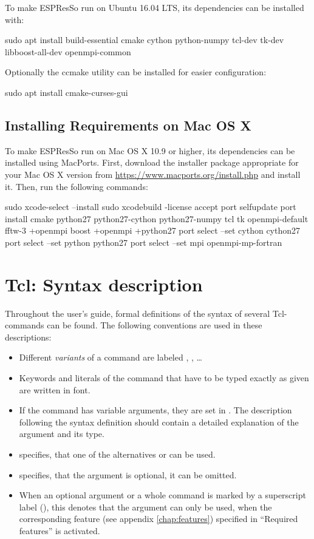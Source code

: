To make ESPResSo run on Ubuntu 16.04 LTS, its dependencies can be installed with:
\begin{code}
  sudo apt install build-essential cmake cython python-numpy tcl-dev tk-dev libboost-all-dev openmpi-common
\end{code}
Optionally the ccmake utility can be installed for easier configuration:
\begin{code}
  sudo apt install cmake-curses-gui
\end{code}

\subsection{Installing Requirements on Mac OS X}
\label{sec:installing_requirements_mac}

To make ESPResSo run on Mac OS X 10.9 or higher, its dependencies can be installed using MacPorts.
First, download the installer package appropriate for your Mac OS X version from \url{https://www.macports.org/install.php} and install it. Then, run the following commands:
\begin{code}
  sudo xcode-select --install
  sudo xcodebuild -license accept
  port selfupdate
  port install cmake python27 python27-cython python27-numpy tcl tk openmpi-default fftw-3 +openmpi boost +openmpi +python27
  port select --set cython cython27
  port select --set python python27
  port select --set mpi openmpi-mp-fortran
\end{code}

\section{Tcl: Syntax description}
\label{sec:syntax}


Throughout the user's guide, formal definitions of the syntax of
several Tcl-commands can be found. The following conventions are used
in these descriptions:
\begin{itemize}
\item Different \emph{variants} of a command are labeled ,
  , \ldots
\item Keywords and literals of the command that have to be typed
  exactly as given are written in  font.
\item If the command has variable arguments, they are set in
  . The description following the syntax definition
  should contain a detailed explanation of the argument and its
  type.
\item \texttt{} specifies, that one
  of the alternatives  or  can be used.
\item \texttt{} specifies, that the argument
   is optional, \ie it can be omitted.
\item When an optional argument or a whole command is marked by a
  superscript label (), this denotes that the argument can
  only be used, when the corresponding feature (see appendix
  \vref{chap:features}) specified in ``Required features'' is
  activated.
\end{itemize}


